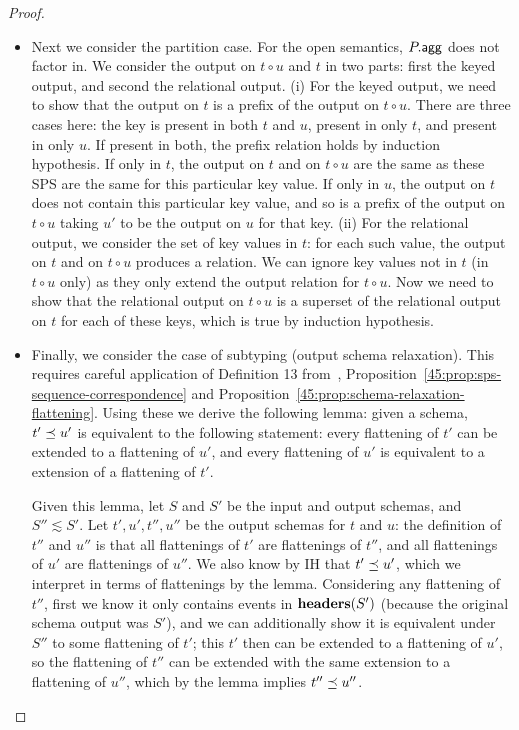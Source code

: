 \begin{proof}
\begin{itemize}
  \item
  Next we consider the partition case.
  For the open semantics, ${P}.{\mathsf{agg}}$ does not factor in.
  We consider the output on $t \circ u$ and $t$
  in two parts: first the keyed output, and second the relational
  output.
  (i)
  For the keyed output, we need to show that the output on
  $t$ is a prefix of the output on $t \circ u$.
  There are three cases here: the key is present in both
  $t$ and $u$, present in only $t$, and present in only $u$.
  If present in both, the prefix relation holds by induction hypothesis.
  If only in $t$, the output on $t$ and on $t \circ u$ are the same
  as these SPS are the same for this particular key value.
  If only in $u$, the output on $t$ does not contain this particular key value,
  and so is a prefix of the output on $t \circ u$
  taking $u'$ to be the output on $u$ for that key.
  (ii)
  For the relational output, we consider the set of key values
  in $t$: for each such value, the output on $t$ and on $t \circ u$
  produces a relation.
  We can ignore key values not in $t$ (in $t \circ u$ only) as they
  only extend the output relation for $t \circ u$.
  Now we need to show that the relational output on $t \circ u$
  is a superset of the relational output on $t$ for each of these keys,
  which is true by induction hypothesis.
  \item
  Finally, we consider the case of subtyping (output schema relaxation).
  This requires careful application of
  Definition 13 from~,
  Proposition~\ref{45:prop:sps-sequence-correspondence}
  and Proposition~\ref{45:prop:schema-relaxation-flattening}.
  Using these we derive the following lemma:
  given a schema, $t' \preceq u'$
  is equivalent to the following statement:
  every flattening of $t'$
  can be extended to a flattening of $u'$,
  and every flattening of $u'$ is equivalent
  to a extension of a flattening of $t'$.

  Given this lemma,
  let $S$ and $S'$ be the input and output schemas,
  and $S'' \lesssim S'$.
  Let $t', u', t'', u''$ be the output schemas for $t$ and $u$:
  the definition of $t''$ and $u''$ is that
  all flattenings of $t'$ are flattenings of $t''$,
  and all flattenings of $u'$ are flattenings of $u''$.
  We also know by IH that $t' \preceq u'$,
  which we interpret in terms of flattenings by the lemma.
  Considering any flattening of $t''$,
  first we know it only contains events in $\mathbf{headers}(S')$
  (because the original schema output was $S'$),
  and we can additionally show it is equivalent under
  $S''$
  to some flattening of $t'$;
  this $t'$ then can be extended to a flattening of $u'$,
  so the flattening of $t''$ can be extended with the same extension
  to a flattening of $u''$,
  which by the lemma implies $t'' \preceq u''$.
  \qedhere{}
  \end{itemize}
\end{proof}
